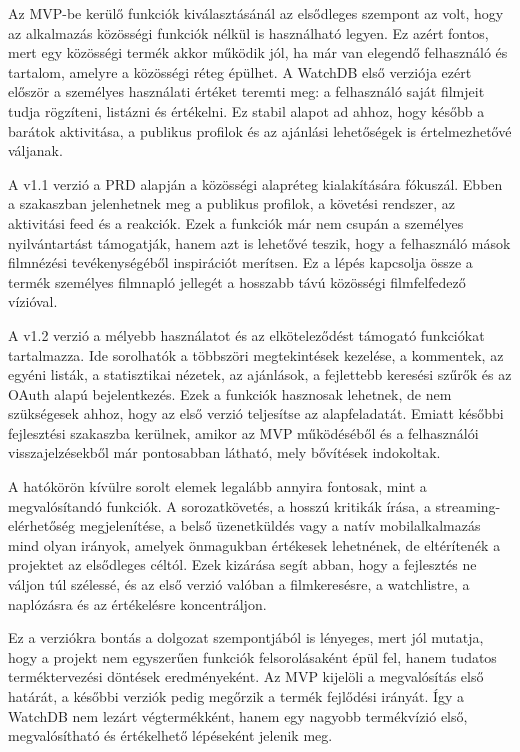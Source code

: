 Az MVP-be kerülő funkciók kiválasztásánál az elsődleges szempont az volt, hogy az alkalmazás közösségi funkciók nélkül is használható legyen. Ez azért fontos, mert egy közösségi termék akkor működik jól, ha már van elegendő felhasználó és tartalom, amelyre a közösségi réteg épülhet. A WatchDB első verziója ezért először a személyes használati értéket teremti meg: a felhasználó saját filmjeit tudja rögzíteni, listázni és értékelni. Ez stabil alapot ad ahhoz, hogy később a barátok aktivitása, a publikus profilok és az ajánlási lehetőségek is értelmezhetővé váljanak.

A v1.1 verzió a PRD alapján a közösségi alapréteg kialakítására fókuszál. Ebben a szakaszban jelenhetnek meg a publikus profilok, a követési rendszer, az aktivitási feed és a reakciók. Ezek a funkciók már nem csupán a személyes nyilvántartást támogatják, hanem azt is lehetővé teszik, hogy a felhasználó mások filmnézési tevékenységéből inspirációt merítsen. Ez a lépés kapcsolja össze a termék személyes filmnapló jellegét a hosszabb távú közösségi filmfelfedező vízióval.

A v1.2 verzió a mélyebb használatot és az elköteleződést támogató funkciókat tartalmazza. Ide sorolhatók a többszöri megtekintések kezelése, a kommentek, az egyéni listák, a statisztikai nézetek, az ajánlások, a fejlettebb keresési szűrők és az OAuth alapú bejelentkezés. Ezek a funkciók hasznosak lehetnek, de nem szükségesek ahhoz, hogy az első verzió teljesítse az alapfeladatát. Emiatt későbbi fejlesztési szakaszba kerülnek, amikor az MVP működéséből és a felhasználói visszajelzésekből már pontosabban látható, mely bővítések indokoltak.

A hatókörön kívülre sorolt elemek legalább annyira fontosak, mint a megvalósítandó funkciók. A sorozatkövetés, a hosszú kritikák írása, a streaming-elérhetőség megjelenítése, a belső üzenetküldés vagy a natív mobilalkalmazás mind olyan irányok, amelyek önmagukban értékesek lehetnének, de eltérítenék a projektet az elsődleges céltól. Ezek kizárása segít abban, hogy a fejlesztés ne váljon túl szélessé, és az első verzió valóban a filmkeresésre, a watchlistre, a naplózásra és az értékelésre koncentráljon.

Ez a verziókra bontás a dolgozat szempontjából is lényeges, mert jól mutatja, hogy a projekt nem egyszerűen funkciók felsorolásaként épül fel, hanem tudatos terméktervezési döntések eredményeként. Az MVP kijelöli a megvalósítás első határát, a későbbi verziók pedig megőrzik a termék fejlődési irányát. Így a WatchDB nem lezárt végtermékként, hanem egy nagyobb termékvízió első, megvalósítható és értékelhető lépéseként jelenik meg.
